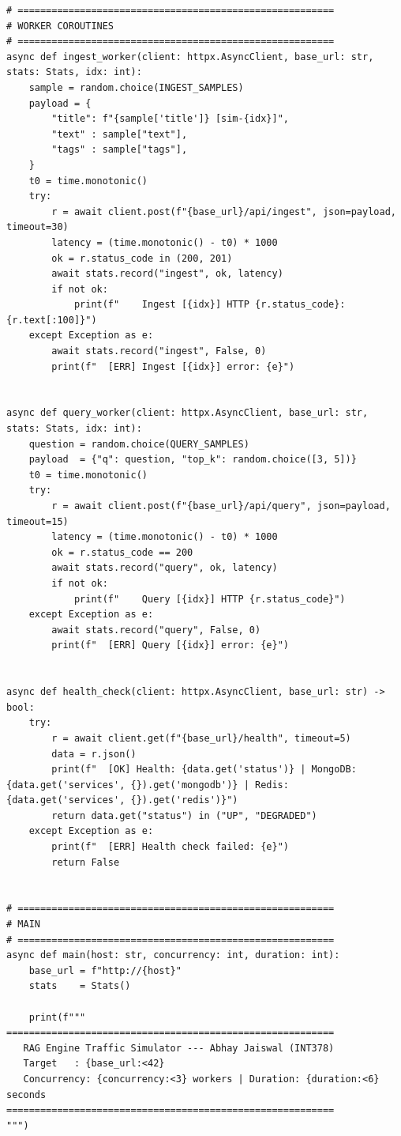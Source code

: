 \documentclass[12pt,a4paper]{report}
\begin{document}
\begin{lstlisting}
# ========================================================
# WORKER COROUTINES
# ========================================================
async def ingest_worker(client: httpx.AsyncClient, base_url: str, stats: Stats, idx: int):
    sample = random.choice(INGEST_SAMPLES)
    payload = {
        "title": f"{sample['title']} [sim-{idx}]",
        "text" : sample["text"],
        "tags" : sample["tags"],
    }
    t0 = time.monotonic()
    try:
        r = await client.post(f"{base_url}/api/ingest", json=payload, timeout=30)
        latency = (time.monotonic() - t0) * 1000
        ok = r.status_code in (200, 201)
        await stats.record("ingest", ok, latency)
        if not ok:
            print(f"    Ingest [{idx}] HTTP {r.status_code}: {r.text[:100]}")
    except Exception as e:
        await stats.record("ingest", False, 0)
        print(f"  [ERR] Ingest [{idx}] error: {e}")


async def query_worker(client: httpx.AsyncClient, base_url: str, stats: Stats, idx: int):
    question = random.choice(QUERY_SAMPLES)
    payload  = {"q": question, "top_k": random.choice([3, 5])}
    t0 = time.monotonic()
    try:
        r = await client.post(f"{base_url}/api/query", json=payload, timeout=15)
        latency = (time.monotonic() - t0) * 1000
        ok = r.status_code == 200
        await stats.record("query", ok, latency)
        if not ok:
            print(f"    Query [{idx}] HTTP {r.status_code}")
    except Exception as e:
        await stats.record("query", False, 0)
        print(f"  [ERR] Query [{idx}] error: {e}")


async def health_check(client: httpx.AsyncClient, base_url: str) -> bool:
    try:
        r = await client.get(f"{base_url}/health", timeout=5)
        data = r.json()
        print(f"  [OK] Health: {data.get('status')} | MongoDB: {data.get('services', {}).get('mongodb')} | Redis: {data.get('services', {}).get('redis')}")
        return data.get("status") in ("UP", "DEGRADED")
    except Exception as e:
        print(f"  [ERR] Health check failed: {e}")
        return False


# ========================================================
# MAIN
# ========================================================
async def main(host: str, concurrency: int, duration: int):
    base_url = f"http://{host}"
    stats    = Stats()

    print(f"""
==========================================================
   RAG Engine Traffic Simulator --- Abhay Jaiswal (INT378)  
   Target   : {base_url:<42}  
   Concurrency: {concurrency:<3} workers | Duration: {duration:<6} seconds    
==========================================================
""")


\end{lstlisting}
\end{document}
